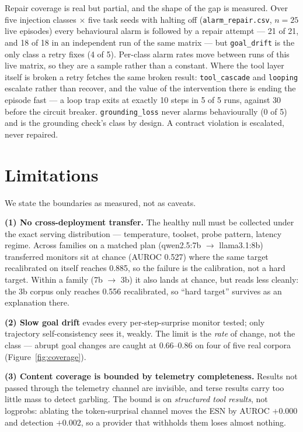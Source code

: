 \documentclass{article}
\begin{document}
Repair coverage is real but partial, and the shape of the gap is measured. Over
five injection classes $\times$ five task seeds with halting off
(\texttt{alarm\_repair.csv}, $n=25$ live episodes) every behavioural alarm is
followed by a repair attempt --- 21 of 21, and 18 of 18 in an independent run of
the same matrix --- but \texttt{goal\_drift} is the only class a retry fixes (4
of 5). Per-class alarm rates move between runs of this live matrix, so they are
a sample rather than a constant. Where the tool layer itself is broken a retry fetches the same broken result:
\texttt{tool\_cascade} and \texttt{looping} escalate rather than recover, and the
value of the intervention there is ending the episode fast --- a loop trap exits
at exactly 10 steps in 5 of 5 runs, against 30 before the circuit breaker.
\texttt{grounding\_loss} never alarms behaviourally (0 of 5) and is the grounding
check's class by design. A contract violation is escalated, never repaired.

\section{Limitations}
\label{sec:limits}

We state the boundaries as measured, not as caveats.

\textbf{(1) No cross-deployment transfer.} The healthy null must be collected
under the exact serving distribution --- temperature, toolset, probe pattern,
latency regime. Across families on a matched plan (qwen2.5:7b
$\rightarrow$ llama3.1:8b) transferred monitors sit at chance (AUROC 0.527)
where the same target recalibrated on itself reaches 0.885, so the failure is
the calibration, not a hard target. Within a family (7b $\rightarrow$ 3b) it
also lands at chance, but reads less cleanly: the 3b corpus only reaches 0.556
recalibrated, so ``hard target'' survives as an explanation there.

\textbf{(2) Slow goal drift} evades every per-step-surprise monitor tested;
only trajectory self-consistency sees it, weakly. The limit is the \emph{rate}
of change, not the class --- abrupt goal changes are caught at 0.66--0.86 on
four of five real corpora (Figure~\ref{fig:coverage}).

\textbf{(3) Content coverage is bounded by telemetry completeness.} Results not
passed through the telemetry channel are invisible, and terse results carry too
little mass to detect garbling. The bound is on \emph{structured tool results},
not logprobs: ablating the token-surprisal channel moves the ESN by AUROC
$+0.000$ and detection $+0.002$, so a provider that withholds them loses almost
nothing.
\end{document}
